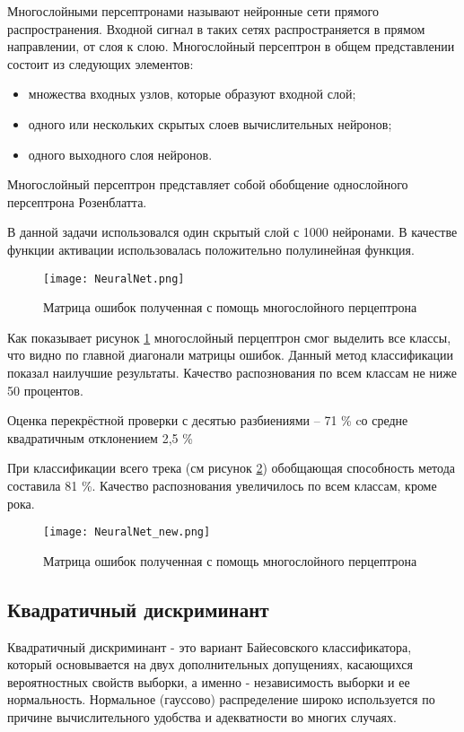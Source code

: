 Многослойными персептронами называют нейронные сети прямого распространения. Входной сигнал в таких сетях распространяется в прямом направлении, от слоя к слою. Многослойный персептрон в общем представлении состоит из следующих элементов:
\begin{itemize}
\item    множества входных узлов, которые образуют входной слой;
\item    одного или нескольких скрытых слоев вычислительных нейронов;
\item    одного выходного слоя нейронов.
\end{itemize}
Многослойный персептрон представляет собой обобщение однослойного персептрона Розенблатта.

В данной задачи использовался один скрытый слой с 1000 нейронами. В качестве функции активации использовалась положительно полулинейная функция.

\begin{figure}[h]
\centering
  \texttt{[image: NeuralNet.png]}
  \caption{Матрица ошибок полученная с помощь многослойного перцептрона}
  \label{fig:results:NeuralNet}
\end{figure}

Как показывает рисунок \ref{fig:results:NeuralNet} многослойный перцептрон смог выделить все классы, что видно по главной диагонали матрицы ошибок. Данный метод классификации показал наилучшие результаты. Качество распознования по всем классам не ниже 50 процентов.

Оценка перекрёстной проверки с десятью разбиениями -- 71 \% cо средне квадратичным отклонением 2,5 \%

При классификации всего трека (см рисунок \ref{fig:results:NeuralNet_new}) обобщающая способность метода составила 81 \%. Качество распознования увеличилось по всем классам, кроме рока. 

\begin{figure}[h]
\centering
  \texttt{[image: NeuralNet\_new.png]}
  \caption{Матрица ошибок полученная с помощь многослойного перцептрона}
  \label{fig:results:NeuralNet_new}
\end{figure}



\subsection{Квадратичный дискриминант}


Квадратичный дискриминант - это вариант Байесовского классификатора, который основывается на двух дополнительных допущениях, касающихся вероятностных свойств выборки, а именно - независимость выборки и ее нормальность. Нормальное (гауссово) распределение широко используется по причине вычислительного удобства и адекватности во многих случаях. 

